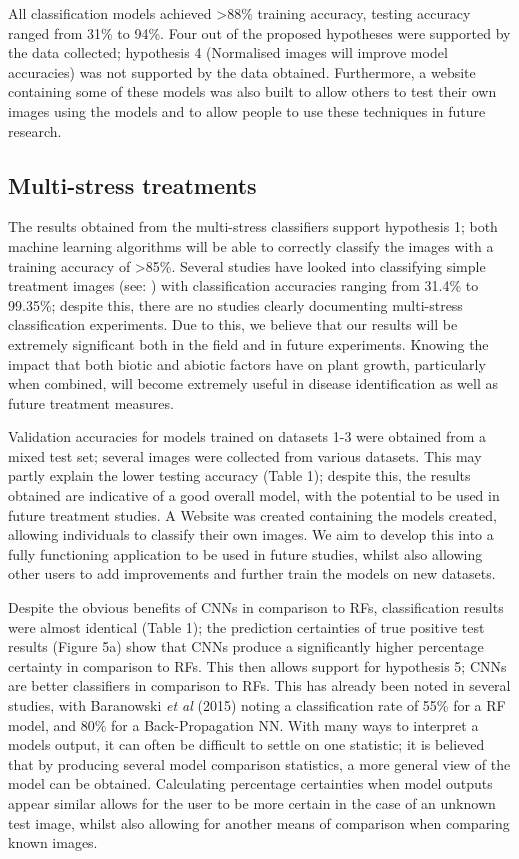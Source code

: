 \documentclass[../../Paper.tex]{subfiles}
\begin{document}
All classification models achieved \textgreater 88\% training accuracy, testing accuracy ranged from 31\% to 94\%. Four out of the proposed hypotheses were supported by the data collected; hypothesis 4 (Normalised images will improve model accuracies) was not supported by the data obtained. Furthermore, a website containing some of these models was also built to allow others to test their own images using the models and to allow people to use these techniques in future research. 


\subsection*{Multi-stress treatments}

The results obtained from the multi-stress classifiers support hypothesis 1; both machine learning algorithms will be able to correctly classify the images with a training accuracy of \textgreater 85\%. Several studies have looked into classifying simple treatment images (see: \cite{baranowski_hyperspectral_2015,mohanty_using_2016,sladojevic_deep_2016,singh_detection_2017}) with classification accuracies ranging from 31.4\% to 99.35\%; despite this, there are no studies clearly documenting multi-stress classification experiments. Due to this, we believe that our results will be extremely significant both in the field and in future experiments. Knowing the impact that both biotic and abiotic factors have on plant growth, particularly when combined, will become extremely useful in disease identification as well as future treatment measures. 

Validation accuracies for models trained on datasets 1-3 were obtained from a mixed test set; several images were collected from various datasets. This may partly explain the lower testing accuracy (Table 1); despite this, the results obtained are indicative of a good overall model, with the potential to be used in future treatment studies. A Website was created containing the models created, allowing individuals to classify their own images. We aim to develop this into a fully functioning application to be used in future studies, whilst also allowing other users to add improvements and further train the models on new datasets.

Despite the obvious benefits of CNNs in comparison to RFs, classification results were almost identical (Table 1); the prediction certainties of true positive test results (Figure 5a) show that CNNs produce a significantly higher percentage certainty in comparison to RFs. This then allows support for hypothesis 5; CNNs are better classifiers in comparison to RFs. This has already been noted in several studies, with Baranowski \textit{et al} (2015) noting a classification rate of 55\% for a RF model, and 80\% for a Back-Propagation NN. With many ways to interpret a models output, it can often be difficult to settle on one statistic; it is believed that by producing several model comparison statistics, a more general view of the model can be obtained. Calculating percentage certainties when model outputs appear similar allows for the user to be more certain in the case of an unknown test image, whilst also allowing for another means of comparison when comparing known images. 
\end{document}
